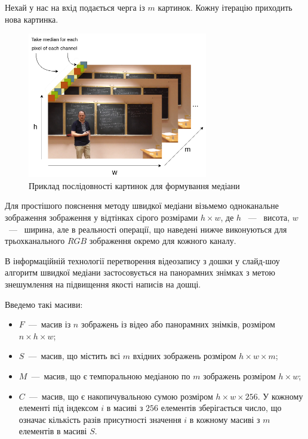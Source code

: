 Нехай у нас на вхід подається черга із $m$ картинок. Кожну ітерацію приходить нова картинка.
\begin{figure}[H]
    \centering
    \includegraphics[width=0.7\textwidth]{images/median_seq}
    \caption{Приклад послідовності картинок для формування медіани \cite{yakovlev_numbers_theory_video}
        \label{fig:median_seq_example}
    }
\end{figure}
Для простішого пояснення методу швидкої медіани візьмемо одноканальне зображення 
зображення у відтінках сірого розмірами $h \times w$, де $h$ ~---~ висота, $w$ ~---~ ширина, 
але в реальності операції, що наведені нижче виконуються для трьохканального $RGB$ зображення 
окремо для кожного каналу.

В інформаційній технології перетворення відеозапису з дошки у слайд-шоу 
\cite{creating_slides_1} \cite{patent_board}
алгоритм швидкої медіани застосовується на панорамних знімках 
з метою знешумлення на підвищення якості написів на дошці.

Введемо такі масиви:
\begin{itemize}
    \item $F$~---~масив із $n$ зображень із відео або панорамних знімків, розміром $n \times  h \times w$;
    \item $S$~---~масив, що містить  всі $m$ вхідних зображень розміром $h \times w \times m$;
    \item $M$~---~масив, що є темпоральною медіаною по $m$ зображень розміром $h \times w$;
    \item $C$~---~масив, що є накопичувальною сумою розміром $h \times w \times 256$. У кожному елементі під індексом $i$ в
          масиві з $256$ елементів зберігається число, що означає кількість разів присутності значення $i$ в кожному
          масиві з $m$ елементів в масиві $S$.
\end{itemize}


